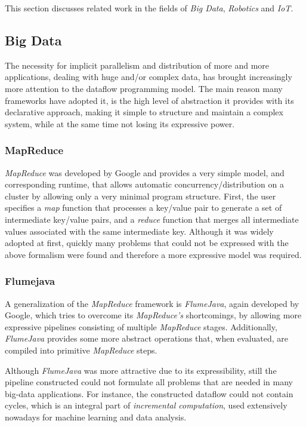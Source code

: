 \documentclass[sigplan,review,anonymous]{acmart}
\begin{document}
This section discusses related work in the fields of \textit{Big Data},
\textit{Robotics} and \textit{IoT}.

\subsection{Big Data}

The necessity for implicit parallelism and distribution of more and more
applications, dealing with huge and/or complex data, has brought increasingly
more attention to the dataflow programming model. The main reason many
frameworks have adopted it, is the high level of abstraction it provides with
its declarative approach, making it simple to structure and maintain a complex
system, while at the same time not losing its expressive power.

\subsubsection{MapReduce}

\textit{MapReduce} was developed by Google and provides a very simple model, and
corresponding runtime, that allows automatic concurrency/distribution on a
cluster by allowing only a very minimal program structure. First, the user
specifies a \textit{map} function that processes a key/value pair to generate a
set of intermediate key/value pairs, and a \textit{reduce} function that merges
all intermediate values associated with the same intermediate key. Although it
was widely adopted at first, quickly many problems that could not be expressed
with the above formalism were found and therefore a more expressive model was
required.

\subsubsection{Flumejava}

A generalization of the \textit{MapReduce} framework is \textit{FlumeJava},
again developed by Google, which tries to overcome its \textit{MapReduce's }
shortcomings, by allowing more expressive pipelines consisting of multiple
\textit{MapReduce} stages. Additionally, \textit{FlumeJava} provides some more
abstract operations that, when evaluated, are compiled into primitive
\textit{MapReduce} steps.

Although \textit{FlumeJava} was more attractive due to its expressibility, still
the pipeline constructed could not formulate all problems that are needed in
many big-data applications. For instance, the constructed dataflow could not
contain cycles, which is an integral part of \textit{incremental computation},
used extensively nowadays for machine learning and data analysis.
\end{document}
